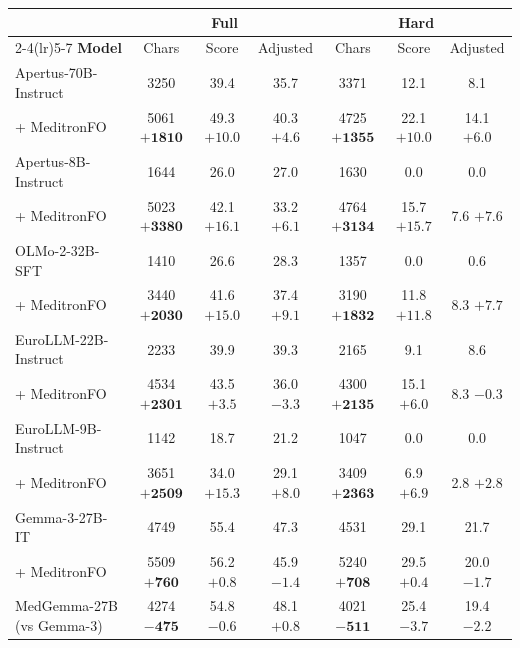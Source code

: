 \begin{tabular}{lcccccc}
\toprule
& \multicolumn{3}{c}{\textbf{Full}} & \multicolumn{3}{c}{\textbf{Hard}} \\
\cmidrule(lr){2-4}\cmidrule(lr){5-7}
\textbf{Model} & Chars & Score & Adjusted & Chars & Score & Adjusted \\
\midrule
Apertus-70B-Instruct & 3250 & 39.4 & 35.7 & 3371 & 12.1 & 8.1 \\
\quad + MeditronFO & 5061 {\scriptsize $\mathbf{+1810}$} & 49.3 {\scriptsize $\mathbf{+10.0}$} & 40.3 {\scriptsize $\mathbf{+4.6}$} & 4725 {\scriptsize $\mathbf{+1355}$} & 22.1 {\scriptsize $\mathbf{+10.0}$} & 14.1 {\scriptsize $\mathbf{+6.0}$} \\
Apertus-8B-Instruct & 1644 & 26.0 & 27.0 & 1630 & 0.0 & 0.0 \\
\quad + MeditronFO & 5023 {\scriptsize $\mathbf{+3380}$} & 42.1 {\scriptsize $\mathbf{+16.1}$} & 33.2 {\scriptsize $\mathbf{+6.1}$} & 4764 {\scriptsize $\mathbf{+3134}$} & 15.7 {\scriptsize $\mathbf{+15.7}$} & 7.6 {\scriptsize $\mathbf{+7.6}$} \\
OLMo-2-32B-SFT & 1410 & 26.6 & 28.3 & 1357 & 0.0 & 0.6 \\
\quad + MeditronFO & 3440 {\scriptsize $\mathbf{+2030}$} & 41.6 {\scriptsize $\mathbf{+15.0}$} & 37.4 {\scriptsize $\mathbf{+9.1}$} & 3190 {\scriptsize $\mathbf{+1832}$} & 11.8 {\scriptsize $\mathbf{+11.8}$} & 8.3 {\scriptsize $\mathbf{+7.7}$} \\
EuroLLM-22B-Instruct & 2233 & 39.9 & 39.3 & 2165 & 9.1 & 8.6 \\
\quad + MeditronFO & 4534 {\scriptsize $\mathbf{+2301}$} & 43.5 {\scriptsize $\mathbf{+3.5}$} & 36.0 {\scriptsize $\mathbf{-3.3}$} & 4300 {\scriptsize $\mathbf{+2135}$} & 15.1 {\scriptsize $\mathbf{+6.0}$} & 8.3 {\scriptsize $-0.3$} \\
EuroLLM-9B-Instruct & 1142 & 18.7 & 21.2 & 1047 & 0.0 & 0.0 \\
\quad + MeditronFO & 3651 {\scriptsize $\mathbf{+2509}$} & 34.0 {\scriptsize $\mathbf{+15.3}$} & 29.1 {\scriptsize $\mathbf{+8.0}$} & 3409 {\scriptsize $\mathbf{+2363}$} & 6.9 {\scriptsize $\mathbf{+6.9}$} & 2.8 {\scriptsize $\mathbf{+2.8}$} \\
Gemma-3-27B-IT & 4749 & 55.4 & 47.3 & 4531 & 29.1 & 21.7 \\
\quad + MeditronFO & 5509 {\scriptsize $\mathbf{+760}$} & 56.2 {\scriptsize $\mathbf{+0.8}$} & 45.9 {\scriptsize $\mathbf{-1.4}$} & 5240 {\scriptsize $\mathbf{+708}$} & 29.5 {\scriptsize $+0.4$} & 20.0 {\scriptsize $\mathbf{-1.7}$} \\
\midrule
MedGemma-27B {\scriptsize (vs Gemma-3)} & 4274 {\scriptsize $\mathbf{-475}$} & 54.8 {\scriptsize $-0.6$} & 48.1 {\scriptsize $\mathbf{+0.8}$} & 4021 {\scriptsize $\mathbf{-511}$} & 25.4 {\scriptsize $\mathbf{-3.7}$} & 19.4 {\scriptsize $\mathbf{-2.2}$} \\
\bottomrule
\end{tabular}
